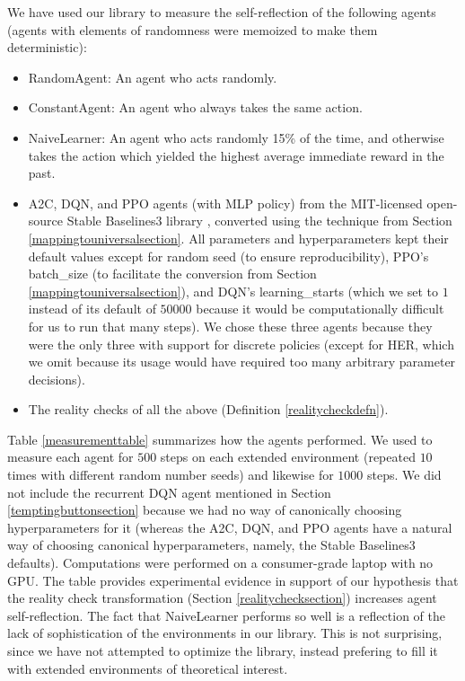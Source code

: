 \documentclass{article}
\begin{document}
We have used our library to measure the self-reflection of the following agents
(agents with elements of randomness were memoized to make them deterministic):
\begin{itemize}
  \item RandomAgent: An agent who acts randomly.
  \item ConstantAgent: An agent who always takes the same action.
  \item NaiveLearner: An agent who acts randomly 15\% of the time, and otherwise
    takes the action which yielded the highest average immediate reward in the past.
  \item A2C, DQN, and PPO agents (with MLP policy)
    from the MIT-licensed open-source Stable Baselines3
    library \cite{stable-baselines3}, converted
    using the technique from Section \ref{mappingtouniversalsection}. All parameters and
    hyperparameters kept their default values except for random seed
    (to ensure reproducibility), PPO's batch\_size (to facilitate the conversion
    from Section \ref{mappingtouniversalsection}), and DQN's
    learning\_starts (which we set to $1$ instead of its default of
    $50000$ because it would be computationally difficult for us to run that many steps).
    We chose these three agents because they were the only three with support for
    discrete policies (except for HER, which we omit because its usage would have required
    too many arbitrary parameter decisions).
  \item The reality checks of all the above (Definition \ref{realitycheckdefn}).
\end{itemize}
Table \ref{measurementtable} summarizes how the agents performed.
We used \cite{library} to measure each agent for $500$ steps on each extended environment
(repeated
$10$ times with different random number seeds) and likewise for $1000$ steps.
We did not include the recurrent DQN agent mentioned in Section \ref{temptingbuttonsection}
because we had no way of canonically choosing hyperparameters for it (whereas
the A2C, DQN, and PPO agents have a natural way of choosing canonical hyperparameters,
namely, the Stable Baselines3 defaults).
Computations were performed on a consumer-grade laptop with no GPU.
The table provides
experimental evidence in support of our hypothesis that the reality check transformation
(Section \ref{realitychecksection}) increases agent self-reflection.
The fact that NaiveLearner performs so well is a reflection of the
lack of sophistication of the environments in our library. This is not
surprising, since we have not attempted to optimize the library, instead
prefering to fill it with extended environments of theoretical interest.
\end{document}
